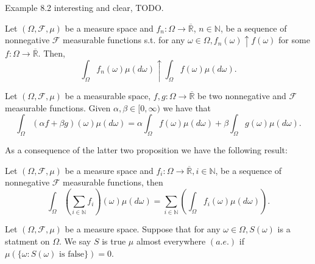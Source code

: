 \begin{example}[]
    \label{ex:8.2}
    Example 8.2 interesting and clear, TODO.
\end{example}

\begin{proposition}
    \label{prop:8.2}
    Let $(\Omega,\mathcal{F}, \mu)$ be a measure space and $f_n:\Omega \to \overline{\mathbb{R}}$,
    $ n \in \mathbb{N}$, be a sequence of nonnegative $\mathcal{F}$ measurable functions s.t.
    for any $\omega \in \Omega, f_n(\omega)\uparrow f(\omega)$ for some $f: \Omega \to 
    \overline{\mathbb{R}}$. Then,
    \[
    \int_{\Omega}f_n(\omega)\mu(d\omega)\uparrow \int_{\Omega}f(\omega)\mu(d\omega)   
    .\] 
\end{proposition}

\begin{proposition}
    \label{prop:8.3}
    Let $(\Omega, \mathcal{F}, \mu)$ be a measurable space, $f, g: \Omega \to \overline{\mathbb{R}}$
    be two nonnegative and $\mathcal{F}$ measurable functions. Given $\alpha, \beta \in  [0, \infty)$ 
    we have that
    \[
    \int_{\Omega} (\alpha f + \beta g)(\omega)\mu(d\omega) =
    \alpha \int_{\Omega} f(\omega)\mu(d\omega) + \beta \int_{\Omega} g(\omega)\mu(d\omega)
    .\] 
\end{proposition}

As a consequence of the latter two proposition we have the following result:

\begin{proposition}[]
    \label{prop:8.4}
    Let $(\Omega, \mathcal{F}, \mu)$ be a measure space and $f_i: \Omega \to
    \overline{\mathbb{R}}, i \in  \mathbb{N}$, be a sequence of nonnegative $\mathcal{F}$ 
    measurable functions, then
    \[
        \int_{\Omega}\left( \sum_{i\in \mathbb{N}} f_i \right) (\omega)\mu(d\omega) =
        \sum_{i \in \mathbb{N}} \left( \int_{\Omega} f_i(\omega)\mu(d\omega) \right) 
    .\] 
\end{proposition}

\begin{definition}
    \label{def:8.4}
    Let $(\Omega, \mathcal{F}, \mu)$ be a measure space. Suppose that for any $\omega
    \in \Omega, S(\omega)$ is a statment on $\Omega$. We say $S$ is true $\mu$ almost
    everywhere $(a.e.)$ if $\mu(\{\omega: S(\omega) \text{ is false}\} ) = 0$.
\end{definition}


